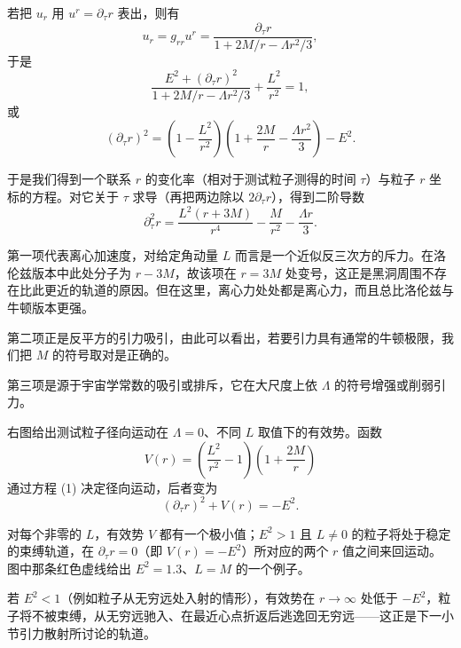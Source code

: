 若把 $u_{r}$ 用 $u^{r}=\partial_{\tau}r$ 表出，则有
\begin{equation*}
u_{r}=g_{rr}u^{r}=\frac{\partial_{\tau} r}{1+2M/r-\Lambda r^{2}/3},
\end{equation*}
于是
\begin{equation*}
\frac{E^{2}+(\partial_{\tau} r)^{2}}{1+2M/r-\Lambda r^{2}/3}+\frac{L^{2}}{r^{2}}=1,
\end{equation*}
或
\begin{equation*}
(\partial_{\tau} r)^{2}=\left(1-\frac{L^{2}}{r^{2}}\right)\left(1+\frac{2M}{r}-\frac{\Lambda r^{2}}{3}\right)-E^{2}.
\tag{1}
\end{equation*}

于是我们得到一个联系 $r$ 的变化率（相对于测试粒子测得的时间 $\tau$）与粒子 $r$ 坐标的方程。对它关于 $\tau$ 求导（再把两边除以 $2\partial_{\tau}r$），得到二阶导数
\begin{equation*}
\partial_{\tau}^{2} r=\frac{L^{2}(r+3M)}{r^{4}}-\frac{M}{r^{2}}-\frac{\Lambda r}{3}.
\tag{2}
\end{equation*}

第一项代表离心加速度，对给定角动量 $L$ 而言是一个近似反三次方的斥力。在洛伦兹版本中此处分子为 $r-3M$，故该项在 $r=3M$ 处变号，这正是黑洞周围不存在比此更近的轨道的原因。但在这里，离心力处处都是离心力，而且总比洛伦兹与牛顿版本更强。

第二项正是反平方的引力吸引，由此可以看出，若要引力具有通常的牛顿极限，我们把 $M$ 的符号取对是正确的。

第三项是源于宇宙学常数的吸引或排斥，它在大尺度上依 $\Lambda$ 的符号增强或削弱引力。


右图给出测试粒子径向运动在 $\Lambda=0$、不同 $L$ 取值下的有效势。函数
\begin{equation*}
V(r)=\left(\frac{L^{2}}{r^{2}}-1\right)\left(1+\frac{2M}{r}\right)
\end{equation*}
通过方程 (1) 决定径向运动，后者变为
\begin{equation*}
(\partial_{\tau} r)^{2}+V(r)=-E^{2}.
\end{equation*}

对每个非零的 $L$，有效势 $V$ 都有一个极小值；$E^{2}>1$ 且 $L\neq0$ 的粒子将处于稳定的束缚轨道，在 $\partial_{\tau}r=0$（即 $V(r)=-E^{2}$）所对应的两个 $r$ 值之间来回运动。图中那条红色虚线给出 $E^{2}=1.3$、$L=M$ 的一个例子。

若 $E^{2}<1$（例如粒子从无穷远处入射的情形），有效势在 $r\to\infty$ 处低于 $-E^{2}$，粒子将不被束缚，从无穷远驰入、在最近心点折返后逃逸回无穷远——这正是下一小节引力散射所讨论的轨道。

